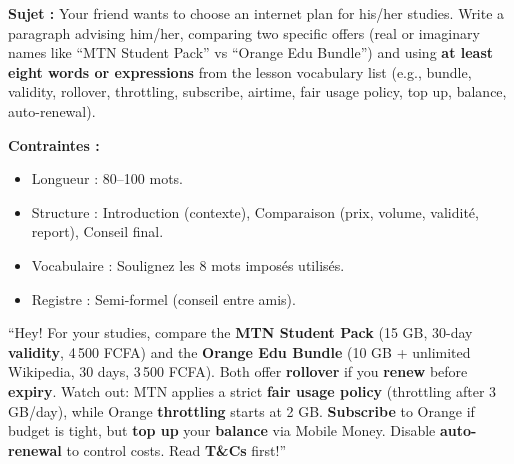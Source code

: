 \documentclass[11pt]{article}
\newcommand{\cle}[1]{{\popxbold\color{popdark}#1}}
\begin{document}
\begin{exercice}
\textbf{Sujet :} Your friend wants to choose an internet plan for his/her studies. Write a paragraph advising him/her, comparing two specific offers (real or imaginary names like “MTN Student Pack” vs “Orange Edu Bundle”) and using \textbf{at least eight words or expressions} from the lesson vocabulary list (e.g., \cle{bundle}, \cle{validity}, \cle{rollover}, \cle{throttling}, \cle{subscribe}, \cle{airtime}, \cle{fair usage policy}, \cle{top up}, \cle{balance}, \cle{auto-renewal}).

\textbf{Contraintes :}
\begin{itemize}
    \item Longueur : 80--100 mots.
    \item Structure : Introduction (contexte), Comparaison (prix, volume, validité, report), Conseil final.
    \item Vocabulaire : Soulignez les 8 mots imposés utilisés.
    \item Registre : Semi-formel (conseil entre amis).
\end{itemize}
\end{exercice}

\begin{exemplebox}
“Hey! For your studies, compare the \textbf{\cle{MTN Student Pack}} (15 GB, 30-day \textbf{\cle{validity}}, 4\,500 FCFA) and the \textbf{\cle{Orange Edu Bundle}} (10 GB + unlimited Wikipedia, 30 days, 3\,500 FCFA). Both offer \textbf{\cle{rollover}} if you \textbf{\cle{renew}} before \textbf{\cle{expiry}}. Watch out: MTN applies a strict \textbf{\cle{fair usage policy}} (throttling after 3 GB/day), while Orange \textbf{\cle{throttling}} starts at 2 GB. \textbf{\cle{Subscribe}} to Orange if budget is tight, but \textbf{\cle{top up}} your \textbf{\cle{balance}} via Mobile Money. Disable \textbf{\cle{auto-renewal}} to control costs. Read \textbf{\cle{T\&Cs}} first!”
\end{exemplebox}
\end{document}

